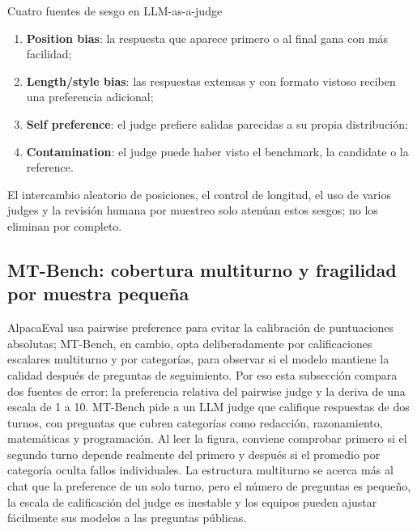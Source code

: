 \begin{warningbox}{Cuatro fuentes de sesgo en LLM-as-a-judge}
\begin{enumerate}
  \item \textbf{Position bias}: la respuesta que aparece primero o al final gana con más facilidad;
  \item \textbf{Length/style bias}: las respuestas extensas y con formato vistoso reciben una preferencia adicional;
  \item \textbf{Self preference}: el judge prefiere salidas parecidas a su propia distribución;
  \item \textbf{Contamination}: el judge puede haber visto el benchmark, la candidate o la reference.
\end{enumerate}
El intercambio aleatorio de posiciones, el control de longitud, el uso de varios judges y la revisión humana por muestreo solo atenúan estos sesgos; no los eliminan por completo.
\end{warningbox}


\subsection{MT-Bench: cobertura multiturno y fragilidad por muestra pequeña}

AlpacaEval usa pairwise preference para evitar la calibración de puntuaciones absolutas; MT-Bench, en cambio, opta deliberadamente por calificaciones escalares multiturno y por categorías, para observar si el modelo mantiene la calidad después de preguntas de seguimiento. Por eso esta subsección compara dos fuentes de error: la preferencia relativa del pairwise judge y la deriva de una escala de 1 a 10. MT-Bench pide a un LLM judge que califique respuestas de dos turnos, con preguntas que cubren categorías como redacción, razonamiento, matemáticas y programación. Al leer la figura, conviene comprobar primero si el segundo turno depende realmente del primero y después si el promedio por categoría oculta fallos individuales. La estructura multiturno se acerca más al chat que la preference de un solo turno, pero el número de preguntas es pequeño, la escala de calificación del judge es inestable y los equipos pueden ajustar fácilmente sus modelos a las preguntas públicas.

